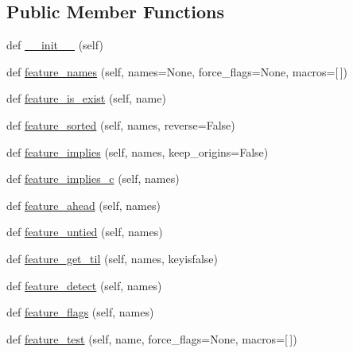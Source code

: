\subsection*{Public Member Functions}
\begin{DoxyCompactItemize}
\item 
def \hyperlink{classnumpy_1_1distutils_1_1ccompiler__opt_1_1__Feature_a0cf31967af0242c0fec79ec02d991ae7}{\+\_\+\+\_\+init\+\_\+\+\_\+} (self)
\item 
def \hyperlink{classnumpy_1_1distutils_1_1ccompiler__opt_1_1__Feature_afd8af969d9b3cc3872efe625903a55bd}{feature\+\_\+names} (self, names=None, force\+\_\+flags=None, macros=\mbox{[}$\,$\mbox{]})
\item 
def \hyperlink{classnumpy_1_1distutils_1_1ccompiler__opt_1_1__Feature_a6134bc5da1036936f31d09184959f5f0}{feature\+\_\+is\+\_\+exist} (self, name)
\item 
def \hyperlink{classnumpy_1_1distutils_1_1ccompiler__opt_1_1__Feature_a2d778f9b3993c56b7d4fe363626d05b3}{feature\+\_\+sorted} (self, names, reverse=False)
\item 
def \hyperlink{classnumpy_1_1distutils_1_1ccompiler__opt_1_1__Feature_a326853cdc7f2baf4945e37946075a5d8}{feature\+\_\+implies} (self, names, keep\+\_\+origins=False)
\item 
def \hyperlink{classnumpy_1_1distutils_1_1ccompiler__opt_1_1__Feature_a4d740c60f856ce7e6950522367c24745}{feature\+\_\+implies\+\_\+c} (self, names)
\item 
def \hyperlink{classnumpy_1_1distutils_1_1ccompiler__opt_1_1__Feature_a670243ec2f2f1ec83e13155f10d0e775}{feature\+\_\+ahead} (self, names)
\item 
def \hyperlink{classnumpy_1_1distutils_1_1ccompiler__opt_1_1__Feature_a71b3eb9d29aca4f71e06b8bfba1cf043}{feature\+\_\+untied} (self, names)
\item 
def \hyperlink{classnumpy_1_1distutils_1_1ccompiler__opt_1_1__Feature_a0193863be451726b816f51e8f8bce067}{feature\+\_\+get\+\_\+til} (self, names, keyisfalse)
\item 
def \hyperlink{classnumpy_1_1distutils_1_1ccompiler__opt_1_1__Feature_a99a15d5127cde74eaacc953ff19e527f}{feature\+\_\+detect} (self, names)
\item 
def \hyperlink{classnumpy_1_1distutils_1_1ccompiler__opt_1_1__Feature_a36b39b27ce1b0e16274b39d40a105fa4}{feature\+\_\+flags} (self, names)
\item 
def \hyperlink{classnumpy_1_1distutils_1_1ccompiler__opt_1_1__Feature_a06dd4af410f1c755833654f3838427a6}{feature\+\_\+test} (self, name, force\+\_\+flags=None, macros=\mbox{[}$\,$\mbox{]})

\end{DoxyCompactItemize}
